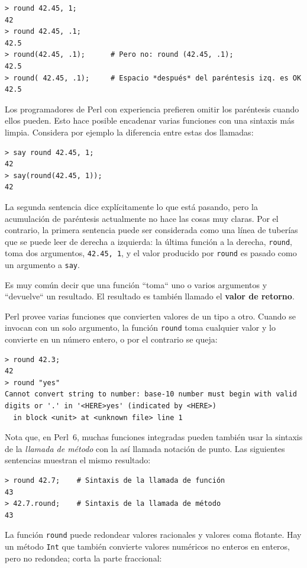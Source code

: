 \begin{verbatim}
> round 42.45, 1;
42
> round 42.45, .1;
42.5
> round(42.45, .1);      # Pero no: round (42.45, .1);
42.5
> round( 42.45, .1);     # Espacio *después* del paréntesis izq. es OK 
42.5
\end{verbatim}

Los programadores de Perl con experiencia prefieren omitir los 
paréntesis cuando ellos pueden. Esto hace posible encadenar varias 
funciones con una sintaxis más limpia. Considera por ejemplo
la diferencia entre estas dos llamadas:

\begin{verbatim}
> say round 42.45, 1;
42
> say(round(42.45, 1));
42
\end{verbatim}

La segunda sentencia dice explícitamente lo que está pasando,
pero la acumulación de paréntesis actualmente no hace las cosas
muy claras. Por el contrario, la primera sentencia puede ser
considerada como una línea de tuberías que se puede leer de derecha 
a izquierda: la última función a la derecha, {\tt round}, toma dos
argumentos, {\tt 42.45, 1}, y el valor producido por {\tt round}
es pasado como un argumento a {\tt say}.

Es muy común decir que una función ``toma`` uno o varios
argumentos y ``devuelve`` un resultado. El resultado es también
llamado el {\bf valor de retorno}.

Perl provee varias funciones que convierten valores de un
tipo a otro. Cuando se invocan con un solo argumento,
la función {\tt round} toma cualquier valor y lo convierte
en un número entero, o por el contrario se queja:

\begin{verbatim}
> round 42.3;
42
> round "yes"
Cannot convert string to number: base-10 number must begin with valid 
digits or '.' in '<HERE>yes' (indicated by <HERE>)
  in block <unit> at <unknown file> line 1
\end{verbatim}

%
Nota que, en Perl~6, muchas funciones integradas pueden también
usar la sintaxis de la \emph{llamada de método} con la así 
llamada notación de punto. Las siguientes sentencias muestran el 
mismo resultado:
\begin{verbatim}
> round 42.7;    # Sintaxis de la llamada de función
43
> 42.7.round;    # Sintaxis de la llamada de método
43
\end{verbatim}
%
La función {\tt round} puede redondear valores racionales
y valores coma flotante. Hay un método {\tt Int} que también
convierte valores numéricos no enteros en enteros, pero
no redondea; corta la parte fraccional:

